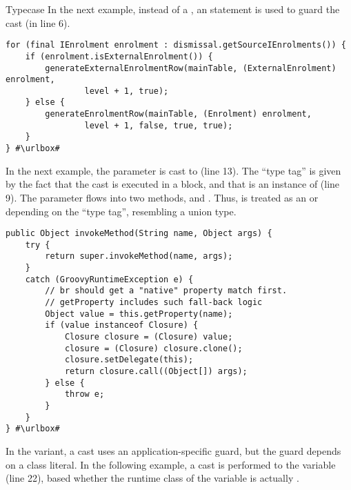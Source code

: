 \begin{pattern}{Typecase}
In the next example, instead of a ,
an  statement is used to guard the cast (in line 6).

\def\urlvar{http://bit.ly/FenixEdu_fenixedu_academic_2SUNOUJ}
\begin{verbatim}
for (final IEnrolment enrolment : dismissal.getSourceIEnrolments()) {
    if (enrolment.isExternalEnrolment()) {
        generateExternalEnrolmentRow(mainTable, (ExternalEnrolment) enrolment,
                level + 1, true);
    } else {
        generateEnrolmentRow(mainTable, (Enrolment) enrolment,
                level + 1, false, true, true);
    }
} #\urlbox#
\end{verbatim}

In the next example,
the parameter  is cast to  (line 13).
The ``type tag'' is given by the fact that the cast is executed in a  block,
and that  is an instance of  (line 9).
The  parameter flows into two methods,
 and
.
Thus,  is treated as an  or  depending on the ``type tag'', resembling a union type.

\def\urlvar{http://bit.ly/groovy_groovy_core_2SGzK16}
\begin{verbatim}
public Object invokeMethod(String name, Object args) {
    try {
        return super.invokeMethod(name, args);
    }
    catch (GroovyRuntimeException e) {
        // br should get a "native" property match first.
        // getProperty includes such fall-back logic
        Object value = this.getProperty(name);
        if (value instanceof Closure) {
            Closure closure = (Closure) value;
            closure = (Closure) closure.clone();
            closure.setDelegate(this);
            return closure.call((Object[]) args);
        } else {
            throw e;
        }
    }
} #\urlbox#
\end{verbatim}

In the  variant, a cast uses an application-specific guard, but the guard depends on a class literal.
In the following example,
a cast is performed to the  variable (line 22),
based whether the runtime class of the variable is actually .


\end{pattern}
